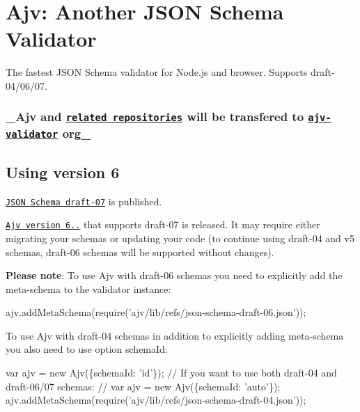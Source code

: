 

\section*{Ajv\+: Another J\+S\+ON Schema Validator}

The fastest J\+S\+ON Schema validator for Node.\+js and browser. Supports draft-\/04/06/07.

\href{https://travis-ci.org/epoberezkin/ajv}{\tt } \href{https://www.npmjs.com/package/ajv}{\tt } \href{https://www.npmjs.com/package/ajv}{\tt } \href{https://coveralls.io/github/epoberezkin/ajv?branch=master}{\tt } \href{https://greenkeeper.io/}{\tt } \href{https://gitter.im/ajv-validator/ajv}{\tt }

\subsubsection*{\+\_\+\+Ajv and \href{#related-packages}{\tt related repositories} will be transfered to \href{https://github.com/ajv-validator}{\tt ajv-\/validator} org\+\_\+}

\subsection*{Using version 6}

\href{http://json-schema.org/latest/json-schema-validation.html}{\tt J\+S\+ON Schema draft-\/07} is published.

\href{https://github.com/epoberezkin/ajv/releases/tag/v6.0.0}{\tt Ajv version 6..} that supports draft-\/07 is released. It may require either migrating your schemas or updating your code (to continue using draft-\/04 and v5 schemas, draft-\/06 schemas will be supported without changes).

{\bfseries Please note}\+: To use Ajv with draft-\/06 schemas you need to explicitly add the meta-\/schema to the validator instance\+:


\begin{DoxyCode}
ajv.addMetaSchema(require('ajv/lib/refs/json-schema-draft-06.json'));
\end{DoxyCode}


To use Ajv with draft-\/04 schemas in addition to explicitly adding meta-\/schema you also need to use option schema\+Id\+:


\begin{DoxyCode}
var ajv = new Ajv(\{schemaId: 'id'\});
// If you want to use both draft-04 and draft-06/07 schemas:
// var ajv = new Ajv(\{schemaId: 'auto'\});
ajv.addMetaSchema(require('ajv/lib/refs/json-schema-draft-04.json'));
\end{DoxyCode}


